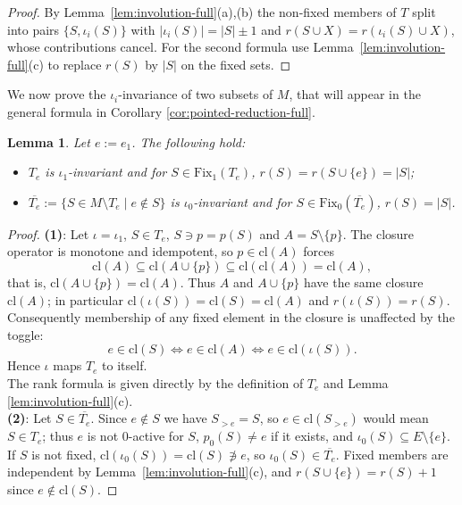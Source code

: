 \documentclass[11pt,a4paper]{article}
\newtheorem{lemma}[theorem]{Lemma}
\theoremstyle{definition}
\newcommand{\cl}{\mathrm{cl}}
\begin{document}
\begin{proof}
By Lemma~\ref{lem:involution-full}(a),(b) the non-fixed members of $T$ split into
pairs $\{S,\iota_i(S)\}$ with $|\iota_i(S)|=|S|\pm1$ and
$r(S\cup X)=r(\iota_i(S)\cup X)$, whose contributions cancel. For the second
formula use Lemma~\ref{lem:involution-full}(c) to replace $r(S)$ by $|S|$ on the
fixed sets.
\end{proof}

We now prove the $\iota_i$-invariance of two subsets of $M$, that will appear in the general formula in Corollary \ref{cor:pointed-reduction-full}.

\begin{lemma}\label{lem:invariance-Te-full}
Let $e := e_1$. The following hold:
\begin{itemize}
    \item[1.] $T_e$ is $\iota_1$-invariant and for $S \in \mathrm{Fix}_1(T_e)$, $r(S) = r(S \cup \{e\})=|S|$;
    \item[2.] $\overline{T_e} := \{S \in M \setminus T_e \mid e \notin S\}$ is $\iota_0$-invariant and for $S \in \mathrm{Fix}_0(\overline{T_e})$, $r(S)=|S|$.
\end{itemize}
\end{lemma}

\begin{proof}
\textbf{(1)}: Let $\iota = \iota_1$, $S \in T_e$, $S \ni p = p(S)$ and $A = S \setminus \{p\}$. The closure operator is monotone and idempotent, so $p \in \mathrm{cl}(A)$ forces
\[
\mathrm{cl}(A) \subseteq \mathrm{cl}(A \cup \{p\}) \subseteq \mathrm{cl}(\mathrm{cl}(A)) = \mathrm{cl}(A),
\]
that is, $\mathrm{cl}(A \cup \{p\}) = \mathrm{cl}(A)$. Thus $A$ and $A \cup \{p\}$ have the same closure $\mathrm{cl}(A)$; in particular $\mathrm{cl}(\iota(S)) = \mathrm{cl}(S) = \mathrm{cl}(A)$ and $r(\iota(S)) = r(S)$. Consequently membership of any fixed element in the closure is unaffected by the toggle:
\[
e \in \mathrm{cl}(S) \iff e \in \mathrm{cl}(A) \iff e \in \mathrm{cl}(\iota(S)).
\]
Hence $\iota$ maps $T_e$ to itself. \\
The rank formula is given directly by the definition of $T_e$ and Lemma \ref{lem:involution-full}(c).\\

\textbf{(2)}: Let $S\in\overline{T_e}$. Since $e\notin S$ we have $S_{>e}=S$, so $e\in\cl(S_{>e})$ would mean $S\in T_e$; thus $e$ is not $0$-active for $S$, $p_0(S)\ne e$ if it exists, and $\iota_0(S)\subseteq E\setminus\{e\}$. If $S$ is not fixed, $\cl(\iota_0(S))=\cl(S)\not\ni e$, so $\iota_0(S)\in\overline{T_e}$. Fixed members are independent by Lemma~\ref{lem:involution-full}(c), and $r(S\cup\{e\})=r(S)+1$ since $e\notin\cl(S)$.
\end{proof}
\end{document}
